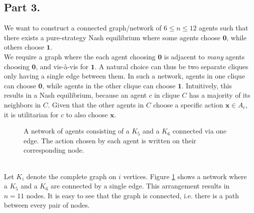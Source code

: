 \documentclass[9pt]{article}
\begin{document}
\subsection*{Part 3.}
We want to construct a connected graph/network of $6 \leq n \leq 12$ agents such that there exists a pure-strategy Nash equilibrium where some agents choose $\textbf{0}$, while others choose $\textbf{1}$. \\
We require a graph where the each agent choosing $\textbf{0}$ is adjacent to \textit{many} agents choosing $\textbf{0}$, and vis-\`a-vis for $\textbf{1}$.
A natural choice can thus be two separate cliques only having a single edge between them.
In such a network, agents in one clique can choose $\textbf{0}$, while agents in the other clique can choose $\textbf{1}$.
Intuitively, this results in a Nash equilibrium, because an agent $c$ in clique $C$ has a majority of its neighbors in $C$.
Given that the other agents in $C$ choose a specific action $\textbf{x} \in A_{c}$, it is utilitarian for $c$ to also choose $\textbf{x}$.
\begin{figure}[htbp]
    \centering
    \caption{A network of agents consisting of a $K_{5}$ and a $K_{6}$ connected via one edge.
    The action chosen by each agent is written on their corresponding node.}
    \label{fig:network}
\end{figure}
\vspace*{0pt} \\
Let $K_{i}$ denote the complete graph on $i$ vertices.
Figure \ref{fig:network} shows a network where a $K_{5}$ and a $K_{6}$ are connected by a single edge.
This arrangement results in $n = 11$ nodes.
It is easy to see that the graph is connected, i.e. there is a path between every pair of nodes.
\end{document}
